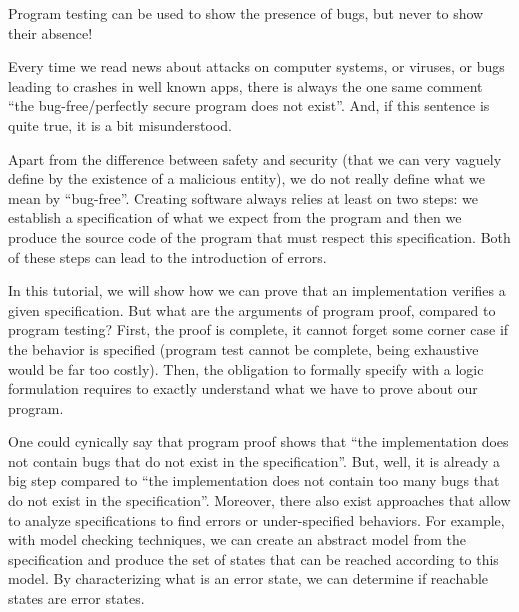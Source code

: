 \begin{Quotation}[Dijkstra]
Program testing can be used to show the presence of bugs, but never to show 
their absence!
\end{Quotation}




Every time we read news about attacks on computer systems, or
viruses, or bugs leading to crashes in well known apps, there is always
the one same comment ``the bug-free/perfectly secure program does not
exist''. And, if this sentence is quite true, it is a bit misunderstood.



Apart from the difference between safety and security (that we can very
vaguely define by the existence of a malicious entity), we do not really
define what we mean by ``bug-free''. Creating software always relies at
least on two steps: we establish a specification of what we expect from
the program and then we produce the source code of the program that must
respect this specification. Both of these steps can lead to the
introduction of errors.



In this tutorial, we will show how we can prove that an implementation
verifies a given specification. But what are the arguments of program
proof, compared to program testing? First, the proof is complete, it
cannot forget some corner case if the behavior is specified (program
test cannot be complete, being exhaustive would be far too costly).
Then, the obligation to formally specify with a logic formulation
requires to exactly understand what we have to prove about our program.



One could cynically say that program proof shows that ``the
implementation does not contain bugs that do not exist in the
specification''. But, well, it is already a big step compared to ``the
implementation does not contain too many bugs that do not exist in the
specification''. Moreover, there also exist approaches that allow to
analyze specifications to find errors or under-specified behaviors. For
example, with model checking techniques, we can create an abstract model
from the specification and produce the set of states that can be reached
according to this model. By characterizing what is an error state, we
can determine if reachable states are error states.





